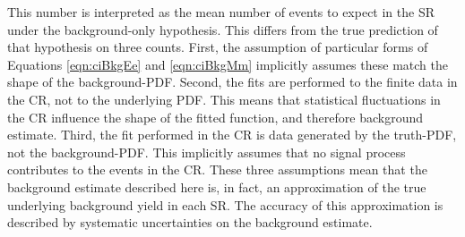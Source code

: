 This number is interpreted as the mean number of events to expect in the SR under the background-only hypothesis.
This differs from the true prediction of that hypothesis on three counts.
First, the assumption of particular forms of Equations \ref{eqn:ciBkgEe} and \ref{eqn:ciBkgMm} implicitly assumes these match the shape of the background-PDF.
Second, the fits are performed to the finite data in the CR, not to the underlying PDF.
This means that statistical fluctuations in the CR influence the shape of the fitted function, and therefore background estimate.
Third, the fit performed in the CR is data generated by the truth-PDF, not the background-PDF. 
This implicitly assumes that no signal process contributes to the events in the CR. 
These three assumptions mean that the background estimate described here is, in fact, an approximation of the true underlying background yield in each SR.
The accuracy of this approximation is described by systematic uncertainties on the background estimate.
